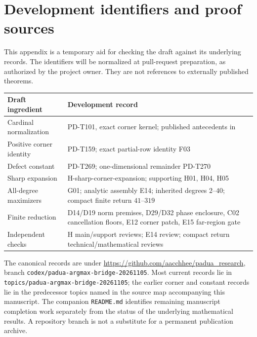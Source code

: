 \section{Development identifiers and proof sources}\label{app:traceability}
This appendix is a temporary aid for checking the draft against its
underlying records. The identifiers will be normalized at pull-request
preparation, as authorized by the project owner. They are not references
to externally published theorems.

\begin{center}\small
\begin{tabular}{p{}p{}}
\toprule
Draft ingredient & Development record \\
\midrule
Cardinal normalization & PD-T101, exact corner kernel; published antecedents in
\cite{Computational2008,BosCaliariDeMarchiVianelloXu2006} \\
Positive corner identity & PD-T159; exact partial-row identity F03 \\
Defect constant & PD-T269; one-dimensional remainder PD-T270 \\
Sharp expansion & H-sharp-corner-expansion; supporting H01, H04, H05 \\
All-degree maximizers & G01; analytic assembly E14; inherited degrees $2$--$40$;
compact finite return $41$--$319$ \\
Finite reduction & D14/D19 norm premises, D29/D32 phase enclosure,
C02 cancellation floors, E12 corner patch, E15 far-region gate \\
Independent checks & H main/support reviews; E14 review; compact return
technical/mathematical reviews \\
\bottomrule
\end{tabular}
\end{center}

The canonical records are under
\url{https://github.com/aacchhee/padua_research}, branch
\texttt{codex/padua-argmax-bridge-20261105}. Most current records lie in
\texttt{topics/padua-argmax-bridge-20261105}; the earlier corner and
constant records lie in the predecessor topics named in the source map
accompanying this manuscript. The companion \texttt{README.md} identifies
remaining manuscript completion work separately from the status of the
underlying mathematical results. A repository branch is not a substitute
for a permanent publication archive.
